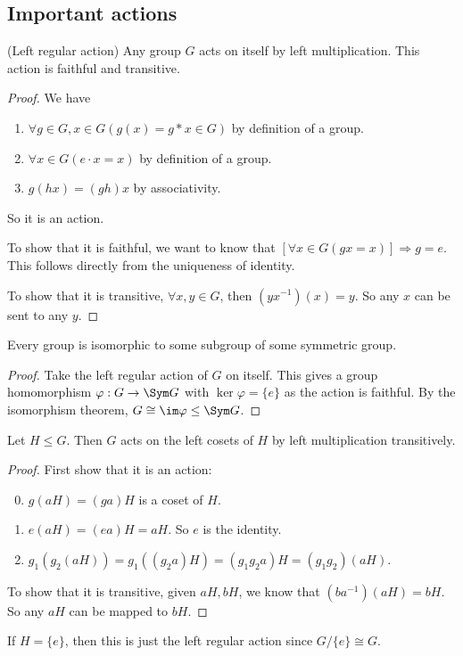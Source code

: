 \documentclass[a4pape]{article}
\begin{document}
\subsection{Important actions}
\begin{lemma}
  (Left regular action) Any group $G$ acts on itself by left multiplication. This action is faithful and transitive.
\end{lemma}
\begin{proof}
  We have
  \begin{enumerate}[label=\arabic{*}.]
  \item $\forall g\in G, x\in G(g(x) = g*x \in G)$ by definition of a group.
  \item $\forall x\in G(e\cdot x = x)$ by definition of a group.
  \item $g(hx) = (gh)x$ by associativity.
  \end{enumerate}
  So it is an action.

  To show that it is faithful, we want to know that $[\forall x\in G(gx = x)]\Rightarrow g = e$. This follows directly from the uniqueness of identity.

  To show that it is transitive, $\forall x, y\in G$, then $(yx^{-1})(x) = y$. So any $x$ can be sent to any $y$.
\end{proof}

\begin{thm}
  Every group is isomorphic to some subgroup of some symmetric group.
\end{thm}

\begin{proof}
  Take the left regular action of $G$ on itself. This gives a group homomorphism $\varphi: G\to \Sym G$ with $\ker \varphi = \{e\}$ as the action is faithful. By the isomorphism theorem, $G \cong \im \varphi \leq \Sym G$.
\end{proof}

\begin{lemma}
  Let $H\leq G$. Then $G$ acts on the left cosets of $H$ by left multiplication transitively.
\end{lemma}

\begin{proof}
  First show that it is an action:
  \begin{enumerate}[label=\arabic{*}.]
  \setcounter{enumi}{-1}
  \item $g(aH) = (ga)H$ is a coset of $H$.
  \item $e(aH) = (ea)H = aH$. So $e$ is the identity.
  \item $g_1(g_2(aH)) = g_1((g_2a)H) = (g_1g_2a)H = (g_1g_2)(aH)$.
  \end{enumerate}

  To show that it is transitive, given $aH, bH$, we know that $(ba^{-1})(aH) = bH$. So any $aH$ can be mapped to $bH$.
\end{proof}
\note If $H = \{e\}$, then this is just the left regular action since $G/\{e\} \cong G$.
\end{document}
